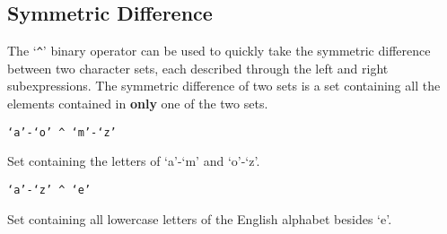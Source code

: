 
\subsection{Symmetric Difference}
{
	The `\texttt{\^}' binary operator can be used to quickly take the
	symmetric difference between two character sets, each described through
	the left and right subexpressions. The symmetric difference of two sets is
	a set containing all the elements contained in \textbf{only} one of the
	two sets.
	
	\begin{itemize}
	{
		\item \texttt{`a'-`o' \^{} `m'-`z'}
		
			Set containing the letters of `a'-`m'
			and `o'-`z'.
		
		\item \texttt{`a'-`z' \^{} `e'}
		
			Set containing all lowercase letters
			of the English alphabet besides `e'.
	}
	\end{itemize}
}
